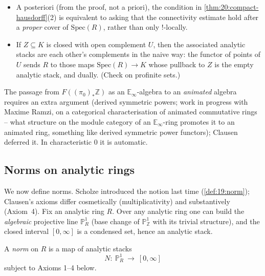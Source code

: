 \begin{remark}
\label{rmk:20:two-remarks}
\leavevmode
\begin{itemize}
\item A posteriori (from the proof, not a priori), the condition in
\cref{thm:20:compact-hausdorff}(2) is equivalent to asking that the connectivity
estimate hold after a \emph{proper} cover of $\mathrm{Spec}(R)$, rather than only
$!$-locally.
\item If $Z\subseteq K$ is closed with open complement $U$, then the associated
analytic stacks are each other's complements in the naive way: the functor of
points of $U$ sends $R$ to those maps $\mathrm{Spec}(R)\to K$ whose pullback to
$Z$ is the empty analytic stack, and dually. (Check on profinite sets.)
\end{itemize}
The passage from $F((\pi_0)_*\mathbb Z)$ as an $\mathbb E_\infty$-algebra to an
\emph{animated} algebra requires an extra argument (derived symmetric powers;
work in progress with Maxime Ramzi, on a categorical characterisation of animated
commutative rings -- what structure on the module category of an $\mathbb
E_\infty$-ring promotes it to an animated ring, something like derived symmetric
power functors); Clausen deferred it. In characteristic $0$ it is automatic.
\end{remark}

\subsection{Norms on analytic rings}
\label{subsec:20:norms}

We now define norms. Scholze introduced the notion last time
(\cref{def:19:norm}); Clausen's axioms differ cosmetically (multiplicativity) and
substantively (Axiom~4). Fix an analytic ring $R$. Over any analytic ring one can
build the \emph{algebraic} projective line $\mathbb P^1_R$ (base change of
$\mathbb P^1_{\mathbb Z}$ with its trivial structure), and the closed interval
$[0,\infty]$ is a condensed set, hence an analytic stack.

\begin{definition}[Norm]
\label{def:20:norm}
A \emph{norm} on $R$ is a map of analytic stacks
\begin{equation*}
N\colon\ \mathbb P^1_R\ \longrightarrow\ [0,\infty]
\end{equation*}
subject to Axioms 1--4 below.
\end{definition}

